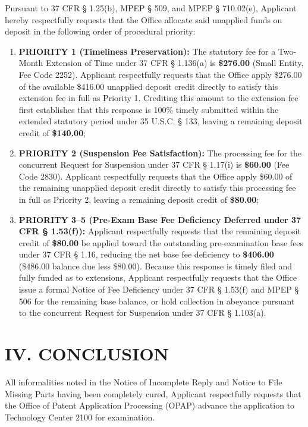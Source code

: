 \documentclass[11pt,letterpaper]{article}
\begin{document}
Pursuant to 37 CFR \S{} 1.25(b), MPEP \S{} 509, and MPEP \S{} 710.02(e), Applicant hereby respectfully requests that the Office allocate said unapplied funds on deposit in the following order of procedural priority:
\begin{enumerate}[leftmargin=*]
    \item \textbf{PRIORITY 1 (Timeliness Preservation):} The statutory fee for a Two-Month Extension of Time under 37 CFR \S{} 1.136(a) is \textbf{\$276.00} (Small Entity, Fee Code 2252). Applicant respectfully requests that the Office apply \$276.00 of the available \$416.00 unapplied deposit credit directly to satisfy this extension fee in full as Priority 1. Crediting this amount to the extension fee first establishes that this response is 100\% timely submitted within the extended statutory period under 35 U.S.C. \S{} 133, leaving a remaining deposit credit of \textbf{\$140.00};
    \item \textbf{PRIORITY 2 (Suspension Fee Satisfaction):} The processing fee for the concurrent Request for Suspension under 37 CFR \S{} 1.17(i) is \textbf{\$60.00} (Fee Code 2830). Applicant respectfully requests that the Office apply \$60.00 of the remaining unapplied deposit credit directly to satisfy this processing fee in full as Priority 2, leaving a remaining deposit credit of \textbf{\$80.00};
    \item \textbf{PRIORITY 3--5 (Pre-Exam Base Fee Deficiency Deferred under 37 CFR \S{} 1.53(f)):} Applicant respectfully requests that the remaining deposit credit of \textbf{\$80.00} be applied toward the outstanding pre-examination base fees under 37 CFR \S{} 1.16, reducing the net base fee deficiency to \textbf{\$406.00} (\$486.00 balance due less \$80.00). Because this response is timely filed and fully funded as to extensions, Applicant respectfully requests that the Office issue a formal Notice of Fee Deficiency under 37 CFR \S{} 1.53(f) and MPEP \S{} 506 for the remaining base balance, or hold collection in abeyance pursuant to the concurrent Request for Suspension under 37 CFR \S{} 1.103(a).
\end{enumerate}

\section*{IV. CONCLUSION}

All informalities noted in the Notice of Incomplete Reply and Notice to File Missing Parts having been completely cured, Applicant respectfully requests that the Office of Patent Application Processing (OPAP) advance the application to Technology Center 2100 for examination.
\end{document}
